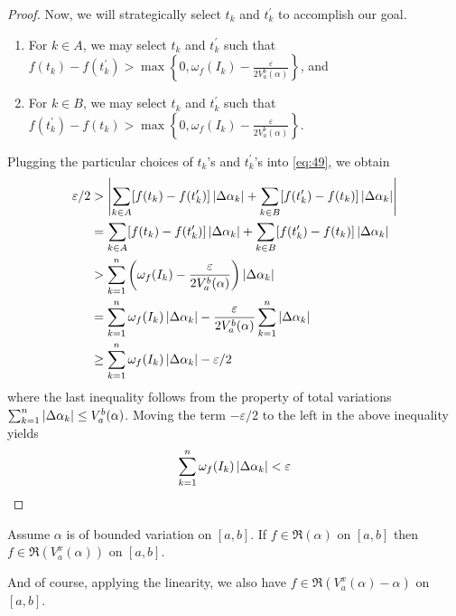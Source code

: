 \documentclass[thmcnt=section, color=blue, 12pt]{my-elegantbook}
\begin{document}
\begin{proof}
	Now, we will strategically select $t_k$ and $t^\prime_k$
	to accomplish our goal.
	\begin{enumerate}
		\item For $k \in A$, we may select $t_k$ and $t^\prime_k$
		      such that $f(t_k) - f(t^\prime_k) > \max \left\{ 0, \omega_f(I_k) - \frac{\varepsilon}{2 V_a^b(\alpha)} \right\}$, and
		\item For $k \in B$, we may select $t_k$ and $t^\prime_k$
		      such that $f(t^\prime_k) - f(t_k) > \max \left\{ 0, \omega_f(I_k) - \frac{\varepsilon}{2 V_a^b(\alpha)} \right\}$.
	\end{enumerate}
	Plugging the particular choices of $t_k$'s and $t^\prime_k$'s
	into \eqref{eq:49}, we obtain
	\begin{align*}
		\varepsilon / 2
		 & > 	\left\lvert 
			\sum_{k \in A} [ f(t_k) - f(t^\prime_k) ] \left\lvert \Delta \alpha_k \right\rvert
			+ \sum_{k \in B} [ f(t_k^\prime) - f(t_k) ] \left\lvert \Delta \alpha_k \right\rvert
		 \right\rvert                                                                           \\
		 & = 	\sum_{k \in A} [ f(t_k) - f(t^\prime_k) ] \left\lvert \Delta \alpha_k \right\rvert
		+ \sum_{k \in B} [ f(t_k^\prime) - f(t_k) ] \left\lvert \Delta \alpha_k \right\rvert           \\
		 & > \sum_{k=1}^n \left(
		\omega_f(I_k) - \frac{\varepsilon}{2 V_a^b(\alpha)}
		\right) \left\lvert \Delta \alpha_k \right\rvert                                               \\
		 & =  \sum_{k=1}^n \omega_f(I_k) \left\lvert \Delta \alpha_k \right\rvert
		- \frac{\varepsilon}{2 V_a^b(\alpha)} \sum_{k=1}^n \left\lvert \Delta \alpha_k \right\rvert    \\
		 & \geq  \sum_{k=1}^n \omega_f(I_k) \left\lvert \Delta \alpha_k \right\rvert - \varepsilon / 2
	\end{align*}
	where the last inequality follows from the property of
	total variations $\sum_{k=1}^n \left\lvert \Delta \alpha_k \right\rvert \leq V_a^b(\alpha)$.
	Moving the term $-\varepsilon / 2$ to the left in the above inequality yields
	\begin{align*}
		\sum_{k=1}^n \omega_f(I_k) \left\lvert \Delta \alpha_k \right\rvert < \varepsilon
	\end{align*}
\end{proof}


\begin{theorem} \label{thm:11}
	Assume $\alpha$ is of bounded variation on $[a, b]$.
	If $f \in \mathfrak{R}(\alpha)$ on $[a, b]$
	then $f \in \mathfrak{R}(V_a^x(\alpha))$ on $[a, b]$.

	And of course, applying the linearity,
	we also have $f \in \mathfrak{R}(V_a^x(\alpha) - \alpha)$ on $[a, b]$.
\end{theorem}
\end{document}
